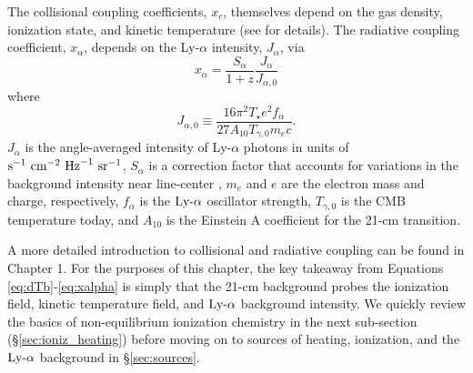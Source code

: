 The collisional coupling coefficients, $x_c$, themselves depend on the gas density, ionization state, and kinetic temperature (see \cite{Zygelman2005} for details). The radiative coupling coefficient, $x_{\alpha}$, depends on the Ly-$\alpha$ intensity, $J_{\alpha}$, via
\begin{equation}
    x_{\alpha} = \frac{S_{\alpha}}{1+z} \frac{J_{\alpha}}{{J}_{\alpha,0}} \label{eq:xalpha}
\end{equation}
where
\begin{equation}
    J_{\alpha,0} \equiv \frac{16\pi^2 T_{\star} e^2 f_{\alpha}}{27 A_{10} T_{\gamma,0} m_e c} . \label{eq:Jnorm}
\end{equation}
$J_{\alpha}$ is the angle-averaged intensity of Ly-$\alpha$ photons in
units of $\text{s}^{-1} \ \text{cm}^{-2} \ \mathrm{Hz}^{-1} \ \text{sr}^{-1}$, $S_{\alpha}$ is a correction factor that
accounts for variations in the background intensity near line-center
\cite{Chen2004,FurlanettoPritchard2006,Hirata2006}, $m_e$ and $e$ are the
electron mass and charge, respectively, $f_{\alpha}$ is the $\text{Ly-}\alpha$ oscillator
strength, $T_{\gamma,0}$ is the CMB temperature today, and $A_{10}$ is the Einstein A coefficient for the 21-cm transition.

A more detailed introduction to collisional and radiative coupling can be found in Chapter 1. For the purposes of this chapter, the key takeaway from Equations \ref{eq:dTb}-\ref{eq:xalpha} is simply that the 21-cm background probes the ionization field, kinetic temperature field, and $\text{Ly-}\alpha$ background intensity. We quickly review the basics of non-equilibrium ionization chemistry in the next sub-section (\S\ref{sec:ioniz_heating}) before moving on to sources of heating, ionization, and the $\text{Ly-}\alpha$ background in \S\ref{sec:sources}.


